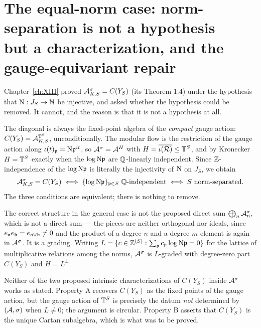 \chapter[The equal-norm case]{The equal-norm case: norm-separation is not a hypothesis\\ but a characterization, and the gauge-equivariant repair}\label{ch:XIV}
\begin{summary}
Chapter~\ref{ch:XIII} proved $\mathcal{A}_{K,S}^\sigma=C(Y_S)$ (its Theorem 1.4) under the
hypothesis that $\mathrm{N}:J_S\to\mathbb{N}$ be injective, and asked whether the hypothesis could be
removed. It cannot, and the reason is that it is not a hypothesis at all.

The diagonal is always the fixed-point algebra of the \emph{compact} gauge action:
$C(Y_S)=\mathcal{A}_{K,S}^{\mathbb{T}^S}$, unconditionally. The modular flow is the restriction of the gauge
action along $\iota(t)_{\mathfrak{p}}=\mathrm{N}\mathfrak{p}^{it}$, so $\mathcal{A}^\sigma=\mathcal{A}^{H}$ with
$H=\overline{\iota(\mathcal{R})}\le\mathbb{T}^S$, and by Kronecker $H=\mathbb{T}^S$ exactly when the $\log\mathrm{N}\mathfrak{p}$ are
$\mathbb{Q}$-linearly independent. Since $\mathbb{Z}$-independence of the $\log\mathrm{N}\mathfrak{p}$ is literally the
injectivity of $\mathrm{N}$ on $J_S$, we obtain
\[
\mathcal{A}_{K,S}^\sigma=C(Y_S)
\iff \{\log\mathrm{N}\mathfrak{p}\}_{\mathfrak{p}\in S}\ \mathbb{Q}\text{-independent}
\iff S\ \text{norm-separated}.
\]
The three conditions are equivalent; there is nothing to remove.

The correct structure in the general case is not the proposed direct sum
$\bigoplus_n\mathcal{A}^\sigma_n$, which is not a direct sum --- the pieces are neither orthogonal
nor ideals, since $e_{\mathfrak{a}} e_{\mathfrak{b}}=e_{\mathfrak{a}\vee\mathfrak{b}}\ne0$ and the product of a degree-$n$ and a
degree-$m$ element is again in $\mathcal{A}^\sigma$. It is a grading. Writing
$L=\{c\in\mathbb{Z}^{(S)}:\sum_{\mathfrak{p}} c_{\mathfrak{p}}\log\mathrm{N}\mathfrak{p}=0\}$ for the lattice of multiplicative relations
among the norms, $\mathcal{A}^\sigma$ is $L$-graded with degree-zero part $C(Y_S)$ and
$H=L^\perp$.

Neither of the two proposed intrinsic characterizations of $C(Y_S)$ inside $\mathcal{A}^\sigma$
works as stated. Property A recovers $C(Y_S)$ as the fixed points of the gauge action, but
the gauge action of $\mathbb{T}^S$ is precisely the datum \emph{not} determined by $(\mathcal{A},\sigma)$
when $L\ne0$; the argument is circular. Property B asserts that $C(Y_S)$ is the unique Cartan
subalgebra, which is what was to be proved.


\end{summary}
